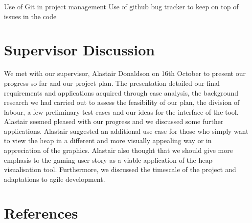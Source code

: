 \documentclass[10pt, a4paper]{article}
\begin{document}
Use of Git in project management
Use of github bug tracker to keep on top of issues in the code

\section{Supervisor Discussion}

We met with our supervisor, Alastair Donaldson on 16th October to present our progress so far and our project plan. The presentation detailed our final requirements and applications acquired through case analysis, the background research we had carried out to assess the feasibility of our plan, the division of labour, a few preliminary test cases and our ideas for the interface of the tool. Alastair seemed pleased with our progress and we discussed some further applications. Alastair suggested an additional use case for those who simply want to view the heap in a different and more visually appealing way or in appreciation of the graphics. Alastair also thought that we should give more emphasis to the gaming user story as a viable application of the heap visualisation tool. Furthermore, we discussed the timescale of the project and adaptations to agile development. 

\section{References} 
%
%
\end{document}
